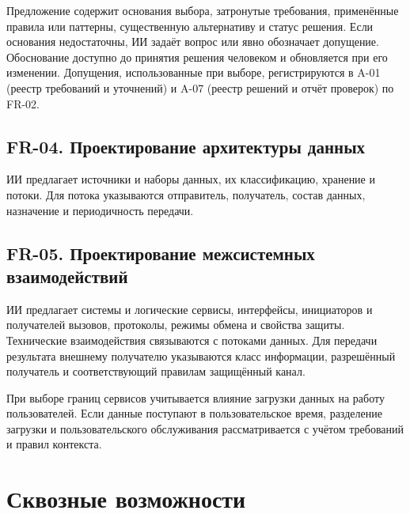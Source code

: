 \documentclass[10pt,a4paper]{article}
\begin{document}
Предложение содержит основания выбора, затронутые требования, применённые правила или паттерны, существенную альтернативу и статус решения. Если основания недостаточны, ИИ задаёт вопрос или явно обозначает допущение. Обоснование доступно до принятия решения человеком и обновляется при его изменении. Допущения, использованные при выборе, регистрируются в A-01 (реестр требований и уточнений) и A-07 (реестр решений и отчёт проверок) по FR-02.

\subsection{FR-04. Проектирование архитектуры данных}\label{fr-04-ux43fux440ux43eux435ux43aux442ux438ux440ux43eux432ux430ux43dux438ux435-ux430ux440ux445ux438ux442ux435ux43aux442ux443ux440ux44b-ux434ux430ux43dux43dux44bux445}

ИИ предлагает источники и наборы данных, их классификацию, хранение и потоки. Для потока указываются отправитель, получатель, состав данных, назначение и периодичность передачи.

\subsection{FR-05. Проектирование межсистемных взаимодействий}\label{fr-05-ux43fux440ux43eux435ux43aux442ux438ux440ux43eux432ux430ux43dux438ux435-ux43cux435ux436ux441ux438ux441ux442ux435ux43cux43dux44bux445-ux432ux437ux430ux438ux43cux43eux434ux435ux439ux441ux442ux432ux438ux439}

ИИ предлагает системы и логические сервисы, интерфейсы, инициаторов и получателей вызовов, протоколы, режимы обмена и свойства защиты. Технические взаимодействия связываются с потоками данных. Для передачи результата внешнему получателю указываются класс информации, разрешённый получатель и соответствующий правилам защищённый канал.

При выборе границ сервисов учитывается влияние загрузки данных на работу пользователей. Если данные поступают в пользовательское время, разделение загрузки и пользовательского обслуживания рассматривается с учётом требований и правил контекста.

\section{Сквозные возможности}\label{ux441ux43aux432ux43eux437ux43dux44bux435-ux432ux43eux437ux43cux43eux436ux43dux43eux441ux442ux438}
\end{document}
